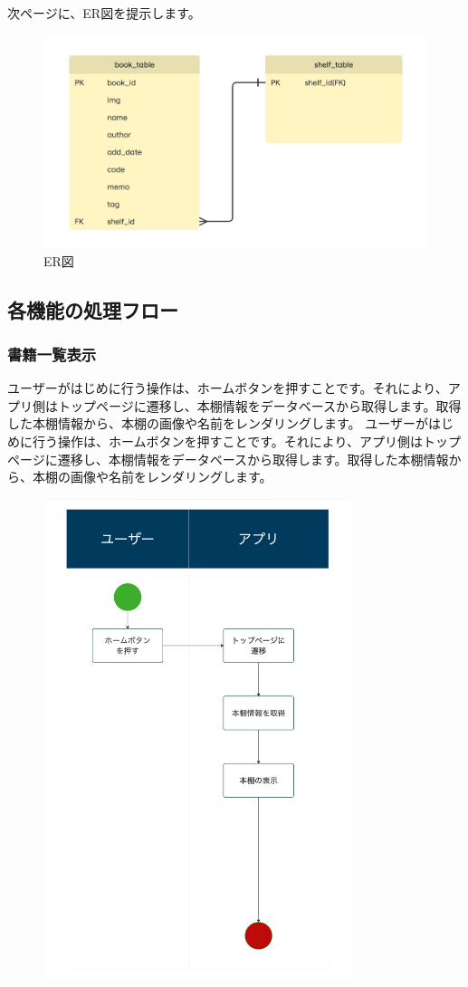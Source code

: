 \documentclass[a4paper, 11pt, titlepage]{jsarticle}
\begin{document}
次ページに、ER図を提示します。
\clearpage
\begin{figure}[htbp]
\centering
\includegraphics[width=120mm]{ER_diagram.jpg}
\caption{ER図}
\label{fig:func}
\end{figure}


\clearpage
\subsection{各機能の処理フロー}
\subsubsection{書籍一覧表示}
ユーザーがはじめに行う操作は、ホームボタンを押すことです。それにより、アプリ側はトップページに遷移し、本棚情報をデータベースから取得します。取得した本棚情報から、本棚の画像や名前をレンダリングします。
ユーザーがはじめに行う操作は、ホームボタンを押すことです。それにより、アプリ側はトップページに遷移し、本棚情報をデータベースから取得します。取得した本棚情報から、本棚の画像や名前をレンダリングします。
\begin{figure}[htbp]
  \centering
  \includegraphics[width=90mm]{flow-ichiran.jpg}
  \label{fig:func}
\end{figure}
\end{document}
